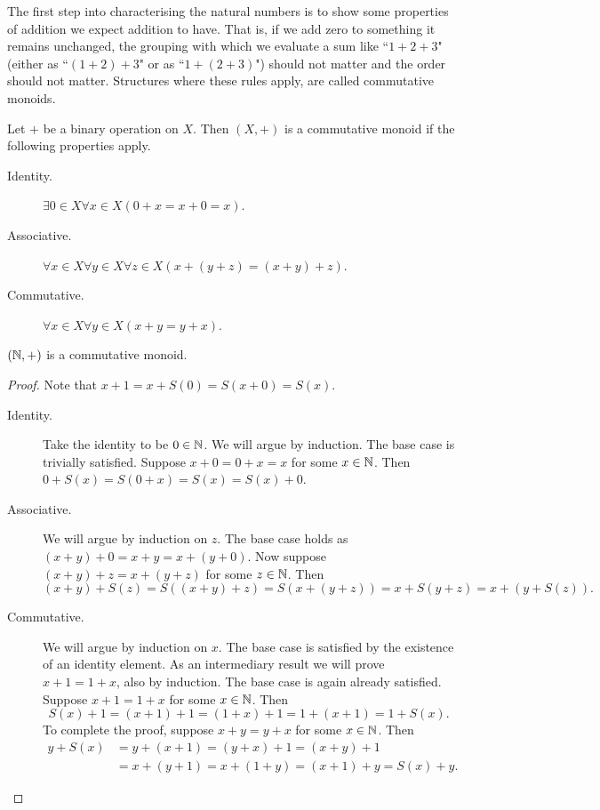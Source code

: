 \documentclass[../main.tex]{subfiles}
\begin{document}
The first step into characterising the natural numbers is to show some properties of addition we expect addition to have. That is, if we add zero to something it remains unchanged, the grouping with which we evaluate a sum like ``$1+2+3$" (either as ``$(1+2)+3$" or as ``$1+(2+3)$") should not matter and the order should not matter. Structures where these rules apply, are called commutative monoids.
\begin{definition}
    Let $+$ be a binary operation on $X$. Then $(X,+)$ is a commutative monoid if the following properties apply.
    \begin{description}
        \item[Identity.] $\exists0\in X\forall x\in X(0+x=x+0=x)$.
        \item[Associative.] $\forall x\in X\forall y\in X\forall z\in X(x+(y+z)=(x+y)+z)$.
        \item[Commutative.] $\forall x\in X\forall y\in X(x+y=y+x)$.
    \end{description}
\end{definition}
\begin{proposition}\label{prp:the_natural_numbers_integers_and_rational_numbers:commutative_monoid_natural_numbers}
    $(\mathbb{N},+)$ is a commutative monoid.
\end{proposition}
\begin{proof}
    Note that $x+1=x+S(0)=S(x+0)=S(x)$.
    \begin{description}
        \item[Identity.] Take the identity to be $0\in\mathbb{N}$. We will argue by induction. The base case is trivially satisfied. Suppose $x+0=0+x=x$ for some $x\in\mathbb{N}$. Then $0+S(x)=S(0+x)=S(x)=S(x)+0$.
        \item[Associative.] We will argue by induction on $z$. The base case holds as $(x+y)+0=x+y=x+(y+0)$. Now suppose $(x+y)+z=x+(y+z)$ for some $z\in\mathbb{N}$. Then
        \begin{equation*}
            (x+y)+S(z)=S((x+y)+z)=S(x+(y+z))=x+S(y+z)=x+(y+S(z)).
        \end{equation*}
        \item[Commutative.] We will argue by induction on $x$. The base case is satisfied by the existence of an identity element. As an intermediary result we will prove $x+1=1+x$, also by induction. The base case is again already satisfied. Suppose $x+1=1+x$ for some $x\in\mathbb{N}$. Then
        \begin{equation*}
            S(x)+1=(x+1)+1=(1+x)+1=1+(x+1)=1+S(x).
        \end{equation*}
        To complete the proof, suppose $x+y=y+x$ for some $x\in\mathbb{N}$. Then
        \begin{align*}
            y+S(x) & =y+(x+1)=(y+x)+1=(x+y)+1 \\
            & =x+(y+1)=x+(1+y)=(x+1)+y=S(x)+y.
        \end{align*}
    \end{description}
\end{proof}
\end{document}
